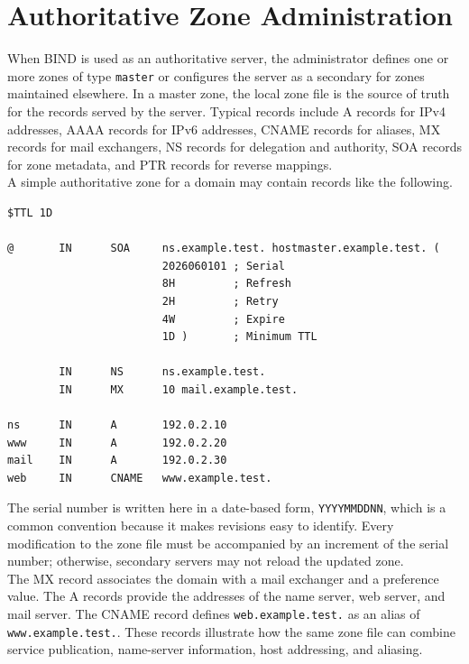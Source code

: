 \documentclass{scrbook}
\begin{document}
	\section{Authoritative Zone Administration}
	
	When BIND is used as an authoritative server, the administrator defines one or more zones of type \texttt{master} or configures the server as a secondary for zones maintained elsewhere. In a master zone, the local zone file is the source of truth for the records served by the server. Typical records include A records for IPv4 addresses, AAAA records for IPv6 addresses, CNAME records for aliases, MX records for mail exchangers, NS records for delegation and authority, SOA records for zone metadata, and PTR records for reverse mappings.\\
	
	A simple authoritative zone for a domain may contain records like the following.
	
	\begin{lstlisting}
$TTL 1D

@       IN      SOA     ns.example.test. hostmaster.example.test. (
                        2026060101 ; Serial
                        8H         ; Refresh
                        2H         ; Retry
                        4W         ; Expire
                        1D )       ; Minimum TTL
	
        IN      NS      ns.example.test.
        IN      MX      10 mail.example.test.
	
ns      IN      A       192.0.2.10
www     IN      A       192.0.2.20
mail    IN      A       192.0.2.30
web     IN      CNAME   www.example.test.
	\end{lstlisting}
	
	The serial number is written here in a date-based form, \texttt{YYYYMMDDNN}, which is a common convention because it makes revisions easy to identify. Every modification to the zone file must be accompanied by an increment of the serial number; otherwise, secondary servers may not reload the updated zone.\\
	
	The MX record associates the domain with a mail exchanger and a preference value. The A records provide the addresses of the name server, web server, and mail server. The CNAME record defines \texttt{web.example.test.} as an alias of \texttt{www.example.test.}. These records illustrate how the same zone file can combine service publication, name-server information, host addressing, and aliasing.
	
\end{document}
